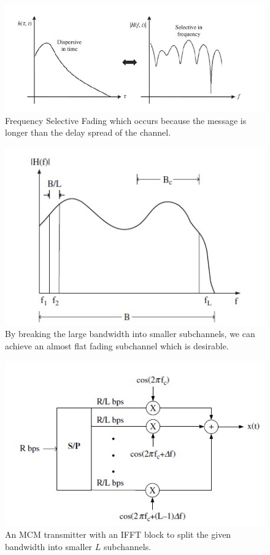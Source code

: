 \begin{figure}[!htbp]
\centering
\includegraphics[scale=1]{Chapter 2/Figures/Frequency Selective Fading}
\caption[Frequency Selective Fading]{Frequency Selective Fading which occurs because the message is longer than the delay spread of the channel.}
\label{fig:frequency selective fading}
\end{figure}

\begin{figure}[!htbp]
\centering
\includegraphics[scale=1]{Chapter 2/Figures/Flat Fading Subchannel}
\caption[Flat Fading Subchannel]{By breaking the large bandwidth into smaller subchannels, we can achieve an almost flat fading subchannel which is desirable.}
\label{fig:flat fading subchannel}
\end{figure}

\begin{figure}[!htbp]
\centering
\includegraphics[scale=1]{Chapter 2/Figures/MCM Transmitter}
\caption[MCM Transmitter]{An MCM transmitter with an IFFT block to split the given bandwidth into smaller $L$ subchannels.}
\label{fig:mcm transmitter}
\end{figure}

